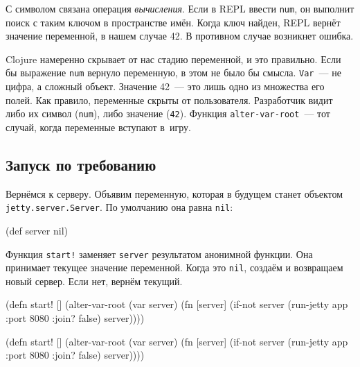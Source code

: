 С символом связана операция \emph{вычисления}. Если в REPL ввести \verb|num|,
он выполнит поиск с таким ключом в пространстве имён. Когда ключ найден, REPL
вернёт значение переменной, в нашем случае 42. В противном случае возникнет
ошибка.

Clojure намеренно скрывает от нас стадию переменной, и это правильно. Если бы
выражение \verb|num| вернуло переменную, в этом не было бы
смысла. \verb|Var|~--- не цифра, а сложный объект. Значение 42~--- это лишь одно
из множества его полей.  Как правило, переменные скрыты от
пользователя. Разработчик видит либо их символ (\verb|num|), либо значение
(\verb|42|). Функция \verb|alter-var-root|~--- тот случай, когда переменные
вступают в~игру.

\subsection{Запуск по требованию}

Вернёмся к серверу. Объявим переменную, которая в будущем станет объектом
\texttt{jetty.server\-.Server}. По умолчанию она равна \verb|nil|:

\begin{english}
  \begin{clojure}
(def server nil)
  \end{clojure}
\end{english}

Функция \verb|start!| заменяет \verb|server| результатом анонимной
функции. Она принимает текущее значение переменной. Когда это \verb|nil|,
создаём и возвращаем новый сервер. Если нет, вернём текущий.

\ifx\DEVICETYPE\MOBILE

\begin{english}
  \begin{clojure}
(defn start! []
  (alter-var-root
   (var server)
   (fn [server]
     (if-not server
       (run-jetty app {:port 8080
                       :join? false})
       server))))
  \end{clojure}
\end{english}

\else

\begin{english}
  \begin{clojure}
(defn start! []
  (alter-var-root
   (var server)
   (fn [server]
     (if-not server
       (run-jetty app {:port 8080 :join? false})
       server))))
  \end{clojure}
\end{english}

